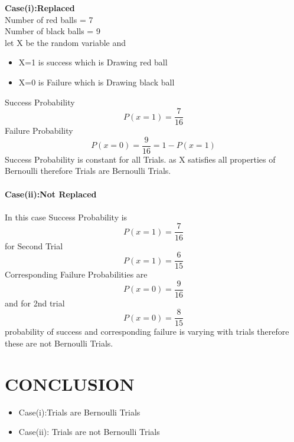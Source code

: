 \documentclass[journal,12pt,twocolumn]{IEEEtran}
\begin{document}
\textbf{Case(i):Replaced} \\ 
Number of red balls = 7\\
Number of black balls = 9\\
let X be the random variable and 
\begin{itemize}
    \item X=1 is success which is Drawing red ball
    \item X=0 is Failure which is Drawing black ball
\end{itemize}
Success Probability 
\begin{equation}
    P(x=1) = \frac{7}{16} 
\end{equation}
Failure Probability
\begin{equation}
     P(x=0) = \frac{9}{16} = 1-P(x=1)
\end{equation}
 Success Probability is  constant for all Trials.
 as X satisfies all properties of Bernoulli therefore Trials are Bernoulli Trials.\\ \\
\textbf{Case(ii):Not Replaced} \\ \\
In this case Success Probability is 
\begin{equation}
    P(x=1) =\frac{7}{16}
\end{equation}
 for Second Trial 
\begin{equation}
     P(x=1) = \frac{6}{15} 
\end{equation} 
 Corresponding Failure Probabilities are 
 \begin{equation}
     P(x=0) = \frac{9}{16}
 \end{equation} and for 2nd trial 
 \begin{equation}
     P(x=0) = \frac{8}{15}
 \end{equation}  
  probability of success and corresponding failure is varying with trials therefore these are not Bernoulli Trials. 
\section{\textbf{CONCLUSION}}
\begin{itemize}
    \item Case(i):Trials are Bernoulli Trials 
    \item Case(ii): Trials are not Bernoulli Trials
\end{itemize}
\end{document}
